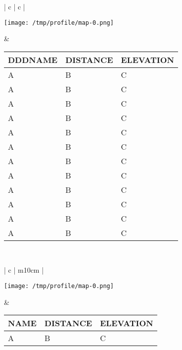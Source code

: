\documentclass[english,ms,10pt]{memoir}
\def\profileheight{5cm}
\def\mapheight{8cm}
\begin{document}
\begin{table}[h!]
  \centering
  \begin{tabular}{ | c | c | }
    \hline
     \\
    \hline
    \begin{minipage}{10cm}
      \centering
      \texttt{[image: /tmp/profile/map-0.png]}
    \end{minipage}
    &
    \begin{tabular}{|l|l|l|}
      \hline
      DDDNAME & DISTANCE & ELEVATION  \\
      \hline
      A & B & C \\
      A & B & C \\
      A & B & C \\
      A & B & C \\
      A & B & C \\
      A & B & C \\
      A & B & C \\
      A & B & C \\
      A & B & C \\
      A & B & C \\
      A & B & C \\
      A & B & C \\
      \hline
    \end{tabular} 
    \\ \hline
  \end{tabular}
\end{table}

\begin{table}[h!]
  \centering
  \begin{tabular}{ | c | m{10cm} | }
    \hline
     \\
    \hline
    \begin{minipage}{.3\textwidth}
      \texttt{[image: /tmp/profile/map-0.png]}
    \end{minipage}
    &
    \begin{tabular}{|l|l|l|}
      \hline
      NAME & DISTANCE & ELEVATION  \\
      \hline
      A & B & C \\
      \hline
    \end{tabular} 
    \\ \hline
  \end{tabular}
\end{table}
\end{document}
